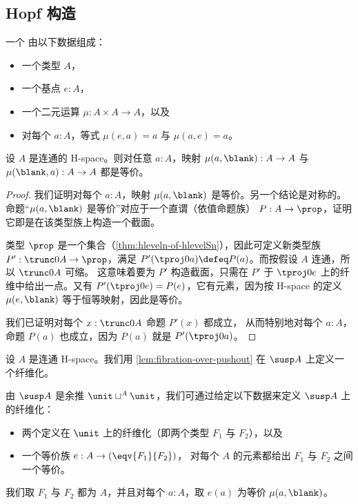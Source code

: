 \subsection{Hopf 构造}

\begin{defn}
  一个
  由以下数据组成：
  \begin{itemize}
  \item 一个类型 $A$，
  \item 一个基点 $e:A$，
  \item 一个二元运算 $\mu:A\times A\to A$，以及
  \item 对每个 $a:A$，等式 $\mu(e,a)=a$ 与 $\mu(a,e)=a$。
  \end{itemize}
\end{defn}

\begin{lem}
  设 $A$ 是连通的 H-space。则对任意 $a:A$，映射 $\mu(a,\blank):A\to
  A$ 与 $\mu(\blank,a):A\to A$ 都是等价。
\end{lem}

\begin{proof}
  我们证明对每个 $a:A$，映射 $\mu(a,\blank)$ 是等价。另一个结论是对称的。
  命题“$\mu(a,\blank)$ 是等价”对应于一个直谓（依值命题族）
  $P:A\to\prop$，证明它即是在该类型族上构造一个截面。

  类型 $\prop$ 是一个集合（\cref{thm:hleveln-of-hlevelSn}），因此可定义新类型族 $P':\trunc0A\to\prop$，满足 $P'(\tproj0a)\defeq
  P(a)$。而按假设 $A$ 连通，所以 $\trunc0A$ 可缩。
  这意味着要为 $P'$ 构造截面，只需在 $P'$ 于 $\tproj0e$ 上的纤维中给出一点。又有
  $P'(\tproj0e)=P(e)$，它有元素，因为按 H-space 的定义 $\mu(e,\blank)$ 等于恒等映射，因此是等价。

  我们已证明对每个 $x:\trunc0A$ 命题 $P'(x)$ 都成立，
  从而特别地对每个 $a:A$，命题 $P(a)$ 也成立，因为
  $P(a)$ 就是 $P'(\tproj0a)$。
\end{proof}

\begin{defn}
  设 $A$ 是连通 H-space。我们用
  \cref{lem:fibration-over-pushout} 在 $\susp A$ 上定义一个纤维化。

  由 $\susp A$ 是余推 $\unit\sqcup^A\unit$，我们可通过给定以下数据来定义 $\susp A$ 上的纤维化：
  \begin{itemize}
  \item 两个定义在 $\unit$ 上的纤维化（即两个类型 $F_1$ 与 $F_2$），以及
  \item 一个等价族 $e:A\to(\eqv{F_1}{F_2})$，
    对每个 $A$ 的元素都给出 $F_1$ 与 $F_2$ 之间一个等价。
  \end{itemize}
  我们取 $F_1$ 与 $F_2$ 都为 $A$，并且对每个 $a:A$，取
  $e(a)$ 为等价 $\mu(a,\blank)$。
\end{defn}

